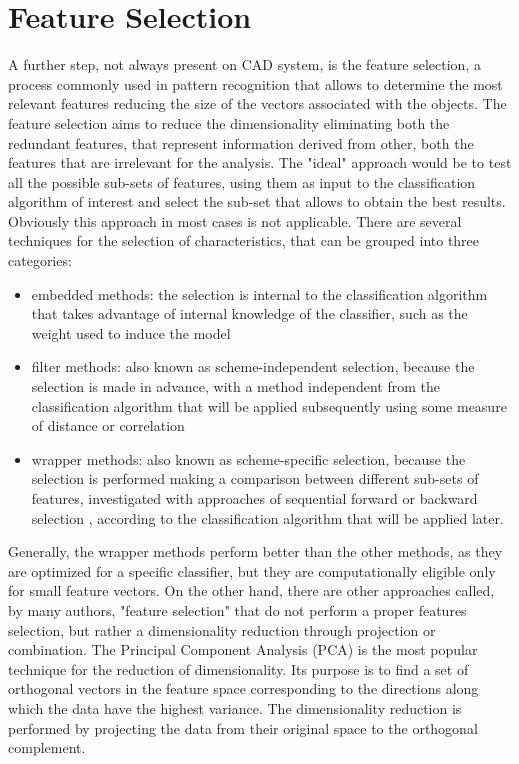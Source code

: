 \documentclass[final,a4paper,12pt,english]{UnicaPhdThesis3}
\begin{document}
	\section{Feature Selection} \label{FS}
	A further step, not always present on CAD system, is the feature selection, a process commonly used in pattern recognition that allows to determine the most relevant features reducing the size of the vectors associated with the objects. The feature selection aims to reduce the dimensionality eliminating both the redundant features, that represent information derived from other, both the features that are irrelevant for
	the analysis. The "ideal" approach would be to test all the possible sub-sets of features, using them as input to the classification algorithm of interest and select the sub-set that allows to obtain the best results. Obviously this approach in most cases is not applicable. There are several techniques for the selection of characteristics, that can be grouped into three categories:
	\begin{itemize}
		\item embedded methods: the selection is internal to the classification algorithm that takes advantage of internal knowledge of the classifier, such as the weight used to induce the model \cite{Duda}
		\item filter methods: also known as scheme-independent selection, because the selection is made in advance, with a method independent from the classification algorithm that will be applied subsequently using some measure of distance or correlation \cite{Yu}
		\item wrapper methods: also known as scheme-specific selection, because the selection is performed making a comparison between different sub-sets of features, investigated with approaches of sequential forward or backward selection \cite{Kittler}, according to the classification algorithm that will be applied later.
	\end{itemize}
	Generally, the wrapper methods perform better than the other methods, as they are optimized for a specific classifier, but they are computationally eligible only for small feature vectors. On the other hand, there are other approaches called, by many authors, "feature selection" that do not perform a proper features selection, but rather a dimensionality reduction through projection or combination. The Principal Component Analysis (\acs{PCA}) \cite{Wold} is the most popular technique for the reduction of dimensionality. Its purpose is to find a set of orthogonal vectors in the feature space corresponding to the directions along which the data have the highest variance. The dimensionality reduction is performed by projecting the data from their original space to the orthogonal complement. 
\end{document}
